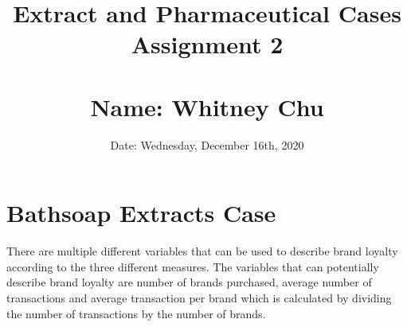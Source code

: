 \documentclass[11pt]{article}
\title{\Bathsoap Extract and Pharmaceutical Cases\\ \vspace{1.0cm}
Assignment 2 \\
\\ \vspace{1.0cm}
Name: Whitney Chu\\
}
\date{Date: Wednesday, December 16th, 2020}
\begin{document}
\begin{titlepage}
    \centering
    \maketitle
    \thispagestyle{empty}
\end{titlepage}

\pagebreak


\newpage
\thispagestyle{empty}
\tableofcontents
\newpage


\newpage
{}



\section{Bathsoap Extracts Case}
There are multiple different variables that can be used to describe brand loyalty according to the three different measures. The variables that can potentially describe brand loyalty are number of brands purchased, average number of transactions and average transaction per brand which is calculated by dividing the number of transactions by the number of brands.
\end{document}
